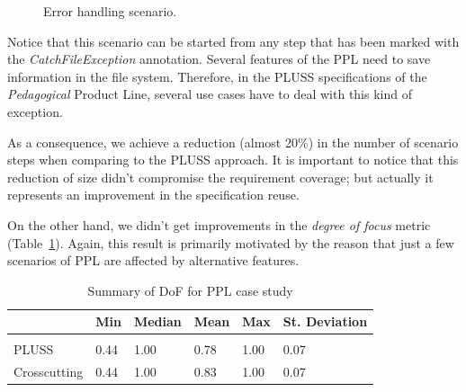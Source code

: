 \documentclass{acm_proc_article-sp}
\begin{document}
\begin{figure}[h] 
\caption{Error handling scenario.}
\label{fig:error-handle} 
\end{figure}

Notice that this scenario can be started from any step that has been marked with
the \emph{CatchFileException} annotation.
Several features of the PPL need to save information in the file system.
Therefore, in the PLUSS specifications of the \emph{Pedagogical}
Product Line, several use cases have to deal with this kind of exception.

As a consequence, we achieve a reduction (almost 20\%) in the number of scenario
steps when comparing to the PLUSS approach. It is important to notice that this
reduction of size didn't compromise the requirement coverage; but actually it
represents an improvement in the specification reuse.

On the other hand, we
didn't get improvements in the \emph{degree of focus} metric
(Table~\ref{tab:ppl-dof}). Again, this result is primarily motivated by the
reason that just a few scenarios of PPL are affected by alternative features.

\begin{table}[htb] \centering
\caption{Summary of DoF for PPL case study}
\label{tab:ppl-dof}
\begin{small}
\begin{tabular}{llllll} \hline
					& Min 	& Median 	& Mean 	& Max 	& St. Deviation \\ \hline \\
	PLUSS			& 0.44	& 1.00		& 0.78	& 1.00	& 0.07			\\
	Crosscutting	& 0.44  & 1.00   	& 0.83 	& 1.00 	& 0.07			\\ \hline	
\end{tabular}
\end{small}
\end{table}
\end{document}

